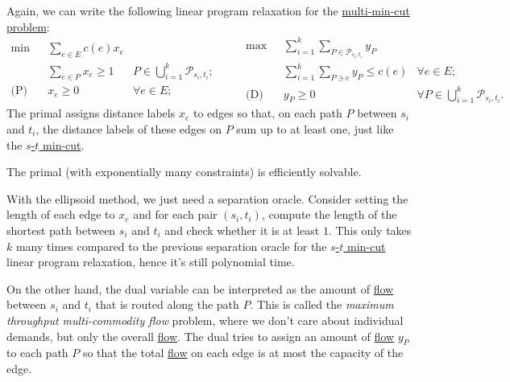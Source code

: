 Again, we can write the following linear program relaxation for the \hyperref[prb:multi-min-cut]{multi-min-cut problem}:
\begin{equation}\label{eq:multi-min-cut-LP}
	\begin{aligned}
		\min~           & \sum_{e \in E} c(e) x_e                                                      \\
		                & \sum_{e \in P} x_e \geq 1 & P \in \bigcup_{i=1}^{k} \mathcal{P}_{s_i, t_i} ; \\
		\text{(P)}\quad & x_e \geq 0                & \forall e \in E;
	\end{aligned}\qquad
	\begin{aligned}
		\max~           & \sum_{i=1}^{k} \sum_{P \in \mathcal{P}_{s_i, t_i}} y_P                                                           \\
		                & \sum_{i=1}^{k} \sum_{P \ni e} y_P \leq c(e)            & \forall e \in E ;                                       \\
		\text{(D)}\quad & y_P \geq 0                                             & \forall P \in \bigcup_{i=1}^{k} \mathcal{P}_{s_i, t_i}.
	\end{aligned}
\end{equation}
The primal assigns distance labels \(x_e\) to edges so that, on each path \(P\) between \(s_i\) and \(t_i\), the distance labels of these edges on \(P\) sum up to at least one, just like the \hyperref[prb:s-t-min-cut]{\(s\)-\(t\) min-cut}.

\begin{remark}
	The primal (with exponentially many constraints) is efficiently solvable.
\end{remark}
\begin{explanation}
	With the ellipsoid method, we just need a separation oracle. Consider setting the length of each edge to \(x_e\) and for each pair \((s_i, t_i)\), compute the length of the shortest path between \(s_i\) and \(t_i\) and check whether it is at least \(1\). This only takes \(k\) many times compared to the previous separation oracle for the \hyperref[prb:s-t-min-cut]{\(s\)-\(t\) min-cut} linear program relaxation, hence it's still polynomial time.
\end{explanation}

On the other hand, the dual variable can be interpreted as the amount of \hyperref[def:flow]{flow} between \(s_i\) and \(t_i\) that is routed along the path \(P\). This is called the \emph{maximum throughput multi-commodity flow} problem, where we don't care about individual demands, but only the overall \hyperref[def:flow]{flow}. The dual tries to assign an amount of \hyperref[def:flow]{flow} \(y_P\) to each path \(P\) so that the total \hyperref[def:flow]{flow} on each edge is at most the capacity of the edge.

